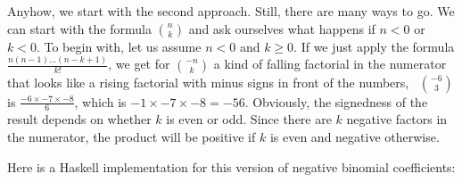 \documentclass[tikz]{scrreprt}
\begin{document}
Anyhow, we start with the second approach.
Still, there are many ways to go.
We can start with the formula $\binom{n}{k}$
and ask ourselves what happens if
$n<0$ or $k<0$.
To begin with, let us assume
$n<0$ and $k\ge 0$.
If we just apply the formula
$\frac{n(n-1)\dots (n-k+1)}{k!}$,
we get for $\binom{-n}{k}$
a kind of falling factorial in the numerator
that looks like a rising factorial with minus signs
in front of the numbers, \eg\ $\binom{-6}{3}$ is
$\frac{-6 \times -7 \times -8}{6}$,
which is $-1 \times -7 \times -8 = -56$.
Obviously, the signedness of the result
depends on whether $k$ is even or odd.
Since there are $k$ negative factors 
in the numerator, the product will be positive
if $k$ is even and negative otherwise.

Here is a Haskell implementation
for this version of negative binomial
coefficients:
\end{document}
